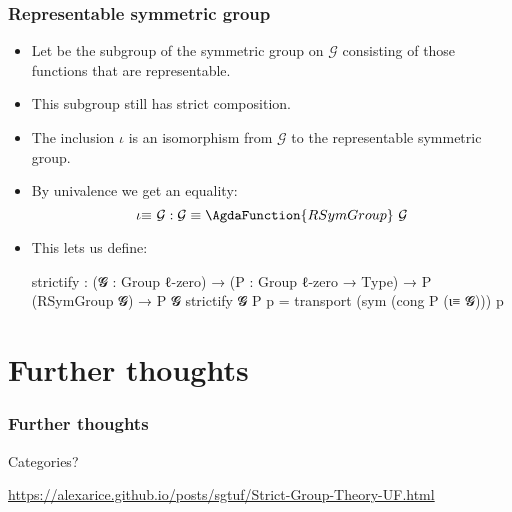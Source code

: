 \documentclass[presentation]{beamer}
\begin{document}
\begin{frame}
  \frametitle{Representable symmetric group}

  \begin{itemize}
  \item<+-> Let \AgdaSpace{} be the subgroup of the symmetric group on \(\mathcal{G}\) consisting of those functions that are representable.

  \item<+-> This subgroup still has strict composition.
  \item<+-> The inclusion \(ι\) is an isomorphism from \(\mathcal{G}\) to the representable symmetric group.
  \item<+-> By univalence we get an equality:
    \[ \iota\mathord\equiv~\mathcal{G}: \mathcal{G} \equiv \AgdaFunction{RSymGroup}~\mathcal{G} \]
  \item<+-> This lets us define:
    \begin{code}
      strictify :  (𝓖 : Group ℓ-zero)
                →  (P : Group ℓ-zero → Type)
                →  P (RSymGroup 𝓖)
                →  P 𝓖
      strictify 𝓖 P p = transport (sym (cong P (ι≡ 𝓖))) p
    \end{code}
  \end{itemize}
\end{frame}

\section{Further thoughts}
\begin{frame}
  \frametitle{Further thoughts}
  \pause{}
  Categories?
\end{frame}
\begin{frame}
  \url{https://alexarice.github.io/posts/sgtuf/Strict-Group-Theory-UF.html}
\end{frame}
\end{document}

